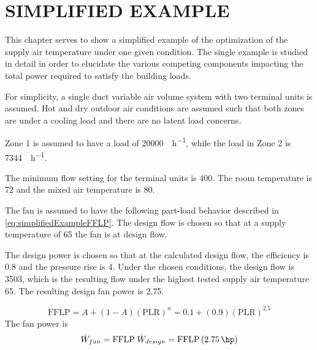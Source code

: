 \chapter{\texorpdfstring{\MakeUppercase{Simplified Example}}{Simplified Example}}

This chapter serves to show a simplified example of the optimization of
the supply air temperature under one given condition. The single example
is studied in detail in order to elucidate the various competing
components impacting the total power required to satisfy the building
loads. 

For simplicity, a single duct variable air volume system with two
terminal units is assumed. Hot and dry outdoor air conditions are
assumed such that both zones are under a cooling load and there are no
latent load concerns.  

Zone 1 is assumed to have a load of \SI{20000}{\btu\per\hour}, while the
load in Zone 2 is \SI{7344}{\btu\per\hour}. 

The minimum flow setting for the terminal units is \SI{400}{\cfm}. The
room temperature is \SI{72}{\degreeF} and the mixed air temperature is
\SI{80}{\degreeF}.

The fan is assumed to have the following part-load behavior described in
 \ref{eq:simplifiedExampleFFLP}. The design
flow is chosen so that at a supply temperature of \SI{65}{\degreeF} the
fan is at design flow. 

The design power is chosen so that at the calculated design flow, the
efficiency is \num{0.8} and the pressure rise is \SI{4}{\inchwater}.
Under the chosen conditions, the design flow is \SI{3503}{\cfm}, which
is the resulting flow under the highest tested supply air temperature
\SI{65}{\degreeF}. The resulting design fan power is \SI{2.75}{\hp}. 

\begin{equation}\label{eq:simplifiedExampleFFLP}
    \text{FFLP} = A + \left(1-A\right)(\text{PLR})^{n} =   0.1 + (0.9)(\text{PLR})^{2.5}
\end{equation}
The fan power is 
\begin{equation}
    \dot{W}_{fan} = \text{FFLP} \; \dot{W}_{design} = \text{FFLP}\left(\SI{2.75}{\hp}\right) 
\end{equation}


